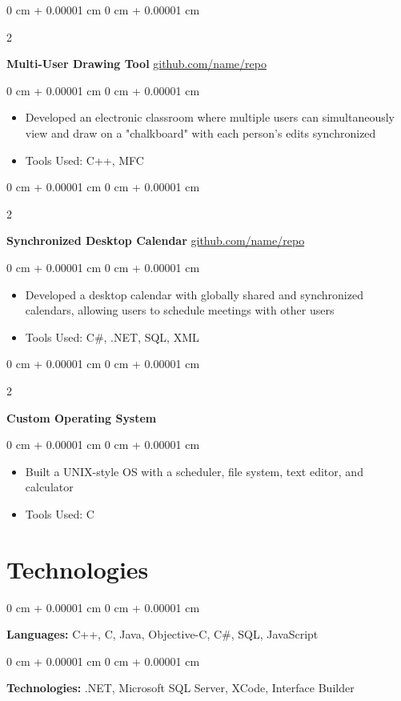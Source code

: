 \documentclass[10pt, letterpaper]{article}
\newenvironment{highlights}{
    \begin{itemize}[
        topsep=0.10 cm,
        parsep=0.10 cm,
        partopsep=0pt,
        itemsep=0pt,
        leftmargin=0 cm + 10pt
    ]
}{
    \end{itemize}
} %
\newenvironment{onecolentry}{
    \begin{adjustwidth}{
        0 cm + 0.00001 cm
    }{
        0 cm + 0.00001 cm
    }
}{
    \end{adjustwidth}
} %
\newenvironment{twocolentry}[2][]{
    \onecolentry
    \def\secondColumn{#2}
    \setcolumnwidth{\fill, 4.5 cm}
    \begin{paracol}{2}
}{
    \switchcolumn \raggedleft \secondColumn
    \end{paracol}
    \endonecolentry
} %
\begin{document}
\begin{twocolentry}{
            \href{https://github.com/sinaatalay/rendercv}{github.com/name/repo}
      }
      \textbf{Multi-User Drawing Tool}\end{twocolentry}

\vspace{0.10 cm}
\begin{onecolentry}
      \begin{highlights}
            \item Developed an electronic classroom where multiple users can simultaneously view
            and draw on a "chalkboard" with each person's edits synchronized
            \item Tools Used: C++, MFC
      \end{highlights}
\end{onecolentry}

\vspace{0.2 cm}

\begin{twocolentry}{
            \href{https://github.com/sinaatalay/rendercv}{github.com/name/repo}
      }
      \textbf{Synchronized Desktop Calendar}\end{twocolentry}

\vspace{0.10 cm}
\begin{onecolentry}
      \begin{highlights}
            \item Developed a desktop calendar with globally shared and synchronized calendars,
            allowing users to schedule meetings with other users
            \item Tools Used: C\#, .NET, SQL, XML
      \end{highlights}
\end{onecolentry}

\vspace{0.2 cm}

\begin{twocolentry}{
            2002
      }
      \textbf{Custom Operating System}\end{twocolentry}

\vspace{0.10 cm}
\begin{onecolentry}
      \begin{highlights}
            \item Built a UNIX-style OS with a scheduler, file system, text editor, and
            calculator
            \item Tools Used: C
      \end{highlights}
\end{onecolentry}

\section{Technologies}

\begin{onecolentry}
      \textbf{Languages:} C++, C, Java, Objective-C, C\#, SQL, JavaScript
\end{onecolentry}

\vspace{0.2 cm}

\begin{onecolentry}
      \textbf{Technologies:} .NET, Microsoft SQL Server, XCode, Interface Builder
\end{onecolentry}
\end{document}
